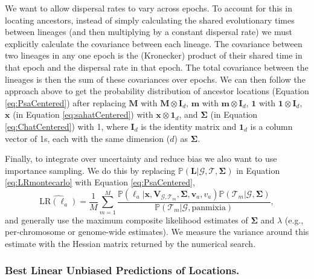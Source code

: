 \documentclass[12pt]{article}
\begin{document}
We want to allow dispersal rates to vary across epochs.
To account for this in locating ancestors, instead of simply calculating the shared evolutionary times between lineages (and then multiplying by a constant dispersal rate) we must explicitly calculate the covariance between each lineage.
The covariance between two lineages in any one epoch is the (Kronecker) product of their shared time in that epoch and the dispersal rate in that epoch.
The total covariance between the lineages is then the sum of these covariances over epochs.
We can then follow the approach above to get the probability distribution of ancestor locations (Equation \eqref{eq:PsaCentered}) after replacing $\mathbf{M}$ with $\mathbf{M} \otimes \mathbf{I}_d$, $\mathbf{m}$ with $\mathbf{m} \otimes \mathbf{I}_d$, $\mathbf{1}$ with $\mathbf{1} \otimes \mathbf{I}_d$, $\mathbf{x}$ (in Equation \eqref{eq:sahatCentered}) with $\mathbf{x} \otimes \mathbf{1}_d$, and $\mathbf{\Sigma}$ (in Equation \eqref{eq:ChatCentered}) with 1, where $\mathbf{I}_d$ is the identity matrix and $\mathbf{1}_d$ is a column vector of 1s, each with the same dimension ($d$) as $\mathbf{\Sigma}$.
   
Finally, to integrate over uncertainty and reduce bias we also want to use importance sampling.
We do this by replacing $\mathbb{P}(\mathbf{L} | \mathcal{G},\mathcal{T}, \mathbf{\Sigma})$ in Equation \eqref{eq:LRmontecarlo} with Equation \eqref{eq:PsaCentered},
%
\begin{equation}\label{eq:LRmontecarloAncestors}
\widehat{\mathrm{LR}(\bm{\ell}_a)} = \frac{1}{M} \sum_{m=1}^{M} \frac{ \mathbb{P}(\bm{\ell}_a | \mathbf{x}, \mathbf{V}_{\mathcal{G},\mathcal{T}_m}, \mathbf{\Sigma}, \mathbf{v}_a, v_a) \mathbb{P}(\mathcal{T}_m | \mathcal{G}, \mathbf{\Sigma})}{\mathbb{P}(\mathcal{T}_m | \mathcal{G},\mathrm{panmixia})},
\end{equation}
%
and generally use the maximum composite likelihood estimates of $\mathbf{\Sigma}$ and $\lambda$ (e.g., per-chromosome or genome-wide estimates).
We measure the variance around this estimate with the Hessian matrix returned by the numerical search.


\subsubsection*{Best Linear Unbiased Predictions of Locations.}
\end{document}
